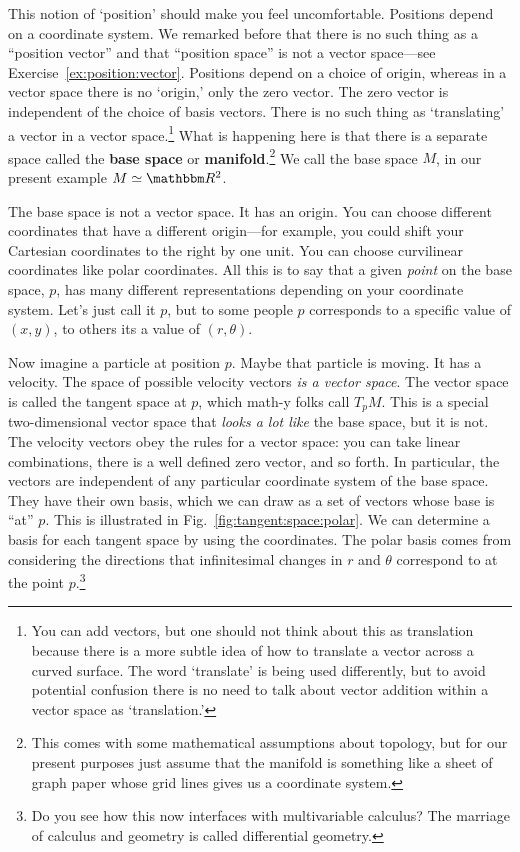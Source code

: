\documentclass[12pt]{article}
\begin{document}
This notion of `position' should make you feel uncomfortable. Positions depend on a coordinate system. We remarked before that there is no such thing as a ``position vector'' and that ``position space'' is not a vector space---see Exercise~\ref{ex:position:vector}. Positions depend on a choice of origin, whereas in a vector space there is no `origin,' only the zero vector. The zero vector is independent of the choice of basis vectors. There is no such thing as `translating' a vector in a vector space.\footnote{You can add vectors, but one should not think about this as translation because there is a more subtle idea of how to translate a vector across a curved surface. The word `translate' is being used differently, but to avoid potential confusion there is no need to talk about vector addition within a vector space as `translation.'} What is happening here is that there is a separate space called the \textbf{base space} or \textbf{manifold}.\footnote{This comes with some mathematical assumptions about topology, but for our present purposes just assume that the manifold is something like a sheet of graph paper whose grid lines gives us a coordinate system.} We call the base space $M$, in our present example $M \simeq \RR^2$.

The base space is not a vector space. It has an origin. You can choose different coordinates that have a different origin---for example, you could shift your Cartesian coordinates to the right by one unit. You can choose curvilinear coordinates like polar coordinates. All this is to say that a given \emph{point} on the base space, $p$, has many different representations depending on your coordinate system. Let's just call it $p$, but to some people $p$ corresponds to a specific value of $(x,y)$, to others its a value of $(r,\theta)$. 

Now imagine a particle at position $p$. Maybe that particle is moving. It has a velocity. The space of possible velocity vectors \emph{is a vector space}. The vector space is called the tangent space at $p$, which math-y folks call $T_pM$. This is a special two-dimensional vector space that \emph{looks a lot like} the base space, but it is not. The velocity vectors obey the rules for a vector space: you can take linear combinations, there is a well defined zero vector, and so forth. In particular, the vectors are independent of any particular coordinate system of the base space. They have their own basis, which we can draw as a set of vectors whose base is ``at'' $p$. This is illustrated in Fig.~\ref{fig:tangent:space:polar}.  We can determine a basis for each tangent space by using the coordinates. The polar basis comes from considering the directions that infinitesimal changes in $r$ and $\theta$ correspond to at the point $p$.\footnote{Do you see how this now interfaces with multivariable calculus? The marriage of calculus and geometry is called differential geometry.}
\end{document}
